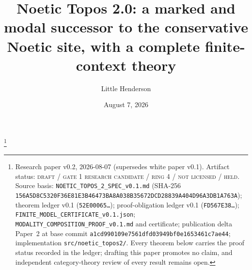 \documentclass[11pt]{amsart}
\theoremstyle{definition}
\theoremstyle{remark}
\begin{document}
\title[The marked and modal Noetic topos]{Noetic Topos 2.0: a marked and modal successor to the conservative Noetic site, with a complete finite-context theory}
\author{Little Henderson}
\thanks{Research paper v0.2, 2026-08-07 (supersedes white paper v0.1). Artifact status: \textsc{draft / gate 1 research candidate / ring 4 / not licensed / held}. Source basis: \texttt{NOETIC\_TOPOS\_2\_SPEC\_v0.1.md} (SHA-256 \texttt{156A5D8C5320F36E81E3B46473BA8A038B35672DCD28839A404D96A3DB1A763A}); theorem ledger v0.1 (\texttt{52E00065\ldots}); proof-obligation ledger v0.1 (\texttt{FD567E38\ldots}); \texttt{FINITE\_MODEL\_CERTIFICATE\_v0.1.json}; \texttt{MODALITY\_COMPOSITION\_PROOF\_v0.1.md} and certificate; publication delta Paper~2 at base commit \texttt{a1cd990109e7561dfd03949bf0e1653461c7ae44}; implementation \texttt{src/noetic\_topos2/}. Every theorem below carries the proof status recorded in the ledger; drafting this paper promotes no claim, and independent category-theory review of every result remains open.}
\date{August 7, 2026}
\end{document}
